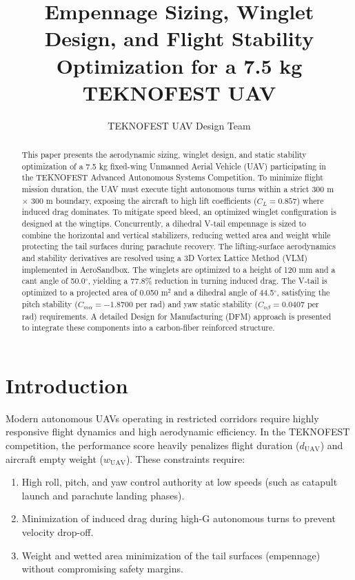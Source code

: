 \documentclass[11pt]{article}
\begin{document}
\title{Empennage Sizing, Winglet Design, and Flight Stability Optimization for a 7.5 kg TEKNOFEST UAV}
\author{TEKNOFEST UAV Design Team}
\maketitle

\begin{abstract}
This paper presents the aerodynamic sizing, winglet design, and static stability optimization of a 7.5 kg fixed-wing Unmanned Aerial Vehicle (UAV) participating in the TEKNOFEST Advanced Autonomous Systems Competition. To minimize flight mission duration, the UAV must execute tight autonomous turns within a strict 300 m $\times$ 300 m boundary, exposing the aircraft to high lift coefficients ($C_L = 0.857$) where induced drag dominates. To mitigate speed bleed, an optimized winglet configuration is designed at the wingtips. Concurrently, a dihedral V-tail empennage is sized to combine the horizontal and vertical stabilizers, reducing wetted area and weight while protecting the tail surfaces during parachute recovery. The lifting-surface aerodynamics and stability derivatives are resolved using a 3D Vortex Lattice Method (VLM) implemented in AeroSandbox. The winglets are optimized to a height of 120 mm and a cant angle of 50.0$^\circ$, yielding a 77.8\% reduction in turning induced drag. The V-tail is optimized to a projected area of 0.050 m$^2$ and a dihedral angle of 44.5$^\circ$, satisfying the pitch stability ($C_{m\alpha} = -1.8700$ per rad) and yaw static stability ($C_{n\beta} = 0.0407$ per rad) requirements. A detailed Design for Manufacturing (DFM) approach is presented to integrate these components into a carbon-fiber reinforced structure.
\end{abstract}

\section{Introduction}
Modern autonomous UAVs operating in restricted corridors require highly responsive flight dynamics and high aerodynamic efficiency. In the TEKNOFEST competition, the performance score heavily penalizes flight duration ($d_{\text{UAV}}$) and aircraft empty weight ($w_{\text{UAV}}$). These constraints require:
\begin{enumerate}
    \item High roll, pitch, and yaw control authority at low speeds (such as catapult launch and parachute landing phases).
    \item Minimization of induced drag during high-G autonomous turns to prevent velocity drop-off.
    \item Weight and wetted area minimization of the tail surfaces (empennage) without compromising safety margins.
\end{enumerate}
\end{document}
